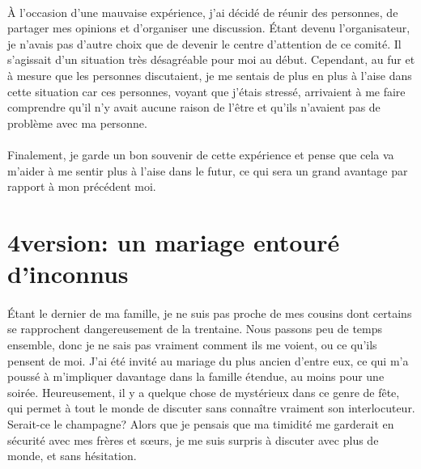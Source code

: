 \paragraph{} À l'occasion d'une mauvaise expérience, j'ai décidé de réunir des
personnes, de partager mes opinions et d'organiser une discussion. Étant devenu
l'organisateur, je n'avais pas d'autre choix que de devenir le centre
d'attention de ce comité. Il s'agissait d'un situation très désagréable pour
moi au début. Cependant, au fur et à mesure que les personnes discutaient, je
me sentais de plus en plus à l'aise dans cette situation car ces personnes,
voyant que j'étais stressé, arrivaient à me faire comprendre qu'il n'y avait
aucune raison de l'être et qu'ils n'avaient pas de problème avec ma personne.

\paragraph{} Finalement, je garde un bon souvenir de cette expérience et pense
que cela va m'aider à me sentir plus à l'aise dans le futur, ce qui sera un
grand avantage par rapport à mon précédent moi.

\section[4\ieme version: le mariage]{4\ieme version: un mariage entouré d'inconnus}

\paragraph{} Étant le dernier de ma famille, je ne suis pas proche de mes
cousins dont certains se rapprochent dangereusement de la trentaine. Nous
passons peu de temps ensemble, donc je ne sais pas vraiment comment ils me
voient, ou ce qu'ils pensent de moi. J'ai été invité au mariage du plus ancien
d'entre eux, ce qui m'a poussé à m'impliquer davantage dans la famille étendue,
au moins pour une soirée. Heureusement, il y a quelque chose de mystérieux dans
ce genre de fête, qui permet à tout le monde de discuter sans connaître
vraiment son interlocuteur. Serait-ce le champagne? Alors que je pensais que
ma timidité me garderait en sécurité avec mes frères et sœurs, je me suis
surpris à discuter avec plus de monde, et sans hésitation.

